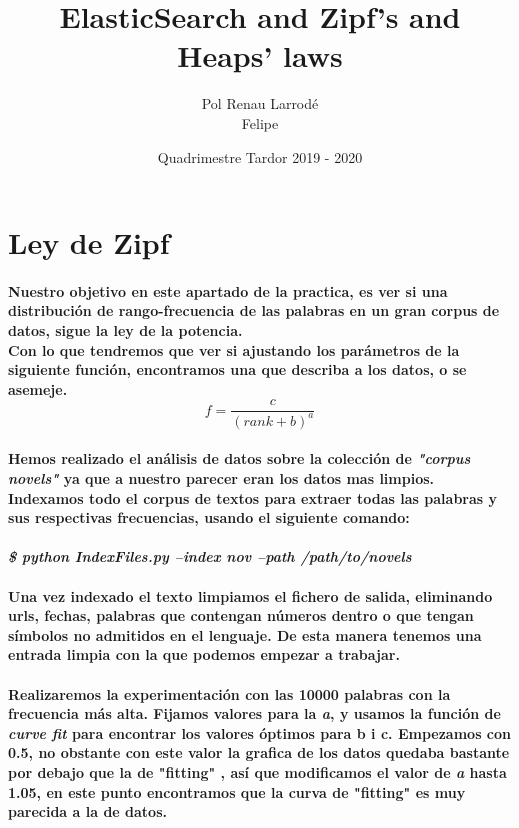 \documentclass{article}
\title{ElasticSearch and Zipf’s and Heaps’ laws}
\date{Quadrimestre Tardor 2019 - 2020}
\author {
  Pol Renau Larrod\'e \\
  Felipe
}
\begin{document}
  \maketitle
  \newpage

  \section{Ley de Zipf}
  \paragraph{
  Nuestro objetivo en este apartado de la practica, es ver si una distribuci\'on de rango-frecuencia de las palabras en un gran corpus de datos, sigue la ley de la potencia.
  \\
  Con lo que tendremos que ver si  ajustando los par\'ametros de la siguiente funci\'on, encontramos una que describa a los datos, o se asemeje.
  \\
  \[ f = \frac{c}{(rank+b)^a} \]
  }
  \paragraph{
  Hemos realizado el análisis de datos sobre la colecci\'on de \textit{"corpus novels"} ya que a nuestro parecer eran los datos mas limpios.
  Indexamos todo el corpus de textos para extraer todas las palabras y sus respectivas frecuencias, usando el siguiente comando:
  \\
  \\
  \textit{ \$ python IndexFiles.py --index nov --path /path/to/novels}
  \\
  \\
  Una vez indexado el texto limpiamos el fichero de salida, eliminando urls, fechas, palabras que contengan n\'umeros dentro o que tengan s\'imbolos no admitidos en el lenguaje.
  De esta manera tenemos una entrada limpia con la que podemos empezar a trabajar.
  }
  \paragraph{
  Realizaremos la experimentaci\'on con las 10000 palabras con la frecuencia más alta. Fijamos valores para la \textit{a}, y usamos la funci\'on de \textit{curve fit} para encontrar los valores \'optimos para b i c.
Empezamos con 0.5, no obstante con este valor la grafica de los datos quedaba bastante por debajo que la de "fitting" ,
   as\'i que modificamos el valor de \textit{a} hasta 1.05, en este punto encontramos que la curva de "fitting" es muy parecida a la de datos.     }
\newpage
\end{document}
